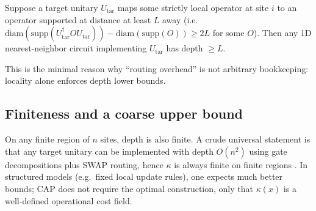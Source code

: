 \begin{corollary}
Suppose a target unitary $U_{\mathrm{tar}}$ maps some strictly local operator at site $i$ to an operator supported at distance at least $L$ away (i.e.\ $\mathrm{diam}(\mathrm{supp}(U_{\mathrm{tar}}^\dagger O U_{\mathrm{tar}}))-\mathrm{diam}(\mathrm{supp}(O))\ge 2L$ for some $O$). Then any 1D nearest-neighbor circuit implementing $U_{\mathrm{tar}}$ has depth $\ge L$.
\end{corollary}

\noindent This is the minimal reason why ``routing overhead'' is not arbitrary bookkeeping: locality alone enforces depth lower bounds.

\subsection{Finiteness and a coarse upper bound}
\label{app:routing_upper_bound}

On any finite region of $n$ sites, depth is also finite. A crude universal statement is that any target unitary can be implemented with depth $O(n^2)$ using gate decompositions plus SWAP routing, hence $\kappa$ is always finite on finite regions \cite{NielsenChuang2000}. In structured models (e.g.\ fixed local update rules), one expects much better bounds; CAP does not require the optimal construction, only that $\kappa(x)$ is a well-defined operational cost field.


